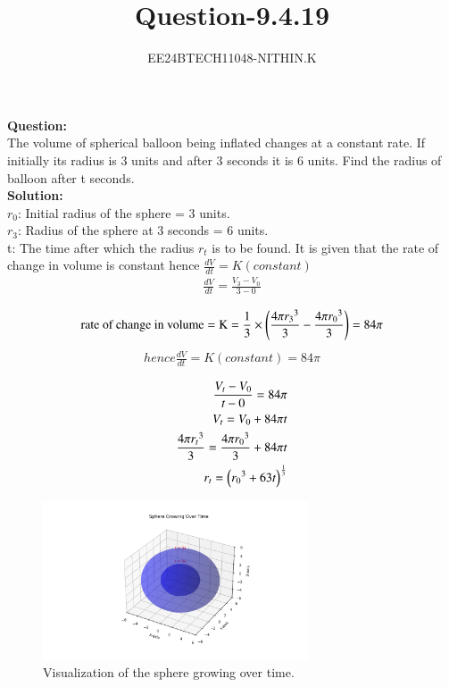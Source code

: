 \documentclass[journal]{IEEEtran}
\numberwithin{equation}{enumi}
\numberwithin{figure}{enumi}
\begin{document}


\title{Question-9.4.19}
\author{EE24BTECH11048-NITHIN.K} 
{\let\newpage\relax\maketitle}

\textbf{Question:} \\
  The volume of spherical balloon being inflated changes at a constant rate. If initially its radius is 3 units and after 3 seconds it is 6 units. Find the radius of balloon after t seconds. \\ 

\textbf{Solution:} \\
$r_0$: Initial radius of the sphere = 3 units. \\
$r_3$: Radius of the sphere at 3 seconds = 6 units. \\
t: The time after which the radius $r_t$ is to be found.
  It is given that the rate of change in volume is constant hence $\frac{dV}{dt} = K(constant)$ \\
  \begin{align*}
	  \frac{dV}{dt} = \frac{V_3 - V_0}{3-0} \\
  \end{align*}
  \begin{align*}
	  \text{rate of change in volume} = \text{K} = \frac{1}{3} \times \left(\frac{4\pi {r_3}^3}{3} - \frac{4\pi {r_0}^3}{3}\right) = 84\pi \\
  \end{align*}
  \begin{align*}
	  hence \frac{dV}{dt} = K(constant) = 84\pi \\
  \end{align*}
  \begin{align*}
	  \frac{V_t - V_0}{t-0} = 84\pi \\
	  V_t = V_0 + 84\pi t \\
	  \frac{4\pi {r_t}^3}{3} = \frac{4\pi {r_0}^3}{3} + 84\pi t \\ 
	  r_t = \left({r_0}^3 + 63t\right)^{\frac{1}{3}}
  \end{align*}

\begin{figure}[H]
    \centering
    \includegraphics[width=0.7\textwidth]{growing_sphere.png}
    \caption{Visualization of the sphere growing over time.}
\end{figure}
\end{document}
